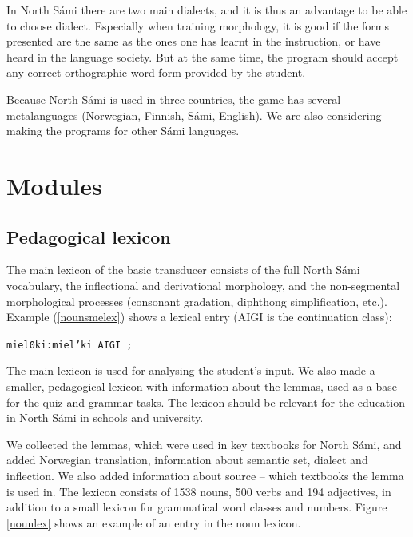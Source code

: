 \documentclass[11pt]{article}
\begin{document}
In North Sámi there are two main dialects, and it is thus an advantage to be able to choose dialect. Especially when training morphology, it is good if the forms presented are the same as the ones one has learnt in the instruction, or have heard in the language society. But at the same time, the program should accept any correct orthographic word form provided by the student.

Because North Sámi is used in three countries, the game has several metalanguages (Norwegian, Finnish, Sámi, English). We are also considering making the programs for other Sámi languages.


\section{Modules}

\subsection{Pedagogical lexicon}

The main lexicon of the basic transducer consists of the full North Sámi vocabulary, the inflectional and derivational morphology, and the non-segmental morphological processes (consonant gradation, diphthong simplification, etc.). Example (\ref{nounsmelex}) shows a lexical entry (AIGI is the continuation class):

\begin{example}\label{nounsmelex}
\begin{itemize}
\texttt{miel0ki:miel'ki AIGI ;}
\end{itemize}
\end{example}


The main lexicon is used for analysing the student's input. We also made a smaller, pedagogical lexicon with information about the lemmas, used as a base for the quiz and grammar tasks. The lexicon should be relevant for the education in North Sámi in schools and university. 

We collected the lemmas, which were used in key textbooks for North Sámi, and added Norwegian translation, information about semantic set, dialect and inflection. We also added information about source -- which textbooks the lemma is used in. %
The lexicon consists of 1538 nouns, 500 verbs and 194 adjectives, in addition to a small lexicon for grammatical word classes and numbers. Figure \ref{nounlex} shows an example of an entry in the noun lexicon. \\
\end{document}
